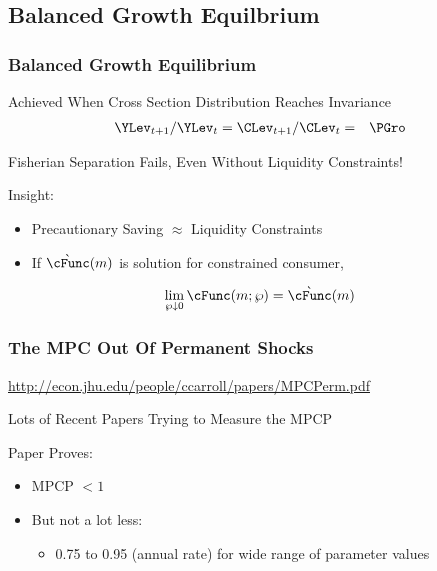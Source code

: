 \documentclass[pdflatex]{beamer}\providecommand{\texname}{BufferStockTheory-Slides}%
\begin{document}
\subsection{Balanced Growth Equilbrium}
\begin{frame}
\frametitle{Balanced Growth Equilibrium}

Achieved When Cross Section Distribution Reaches Invariance
\begin{eqnarray}
  \YLev_{t+1}/\YLev_{t} = \CLev_{t+1}/\CLev_{t} & = & \PGro
\end{eqnarray}

Fisherian Separation Fails, Even Without Liquidity Constraints!
\medskip\medskip

\pause Insight:
\begin{itemize}
\item  Precautionary Saving $\approx$ Liquidity Constraints
\item If $\grave{\cFunc}(m)$ is solution for constrained consumer, 
\end{itemize}
\pause
\begin{equation}
\lim_{ \wp \downarrow 0} \cFunc(m;\wp) = \grave{\cFunc}(m)
\end{equation}


\end{frame}

\begin{frame}
\frametitle{The MPC Out Of Permanent Shocks}

\url{http://econ.jhu.edu/people/ccarroll/papers/MPCPerm.pdf}
\medskip

Lots of Recent Papers Trying to Measure the MPCP

\medskip
Paper Proves:

\begin{itemize}
\item MPCP $< 1$
\item But not a lot less:
\begin{itemize}
\item 0.75 to 0.95 (annual rate) for wide range of parameter values
\end{itemize}
\end{itemize}

\end{frame}
\end{document}
